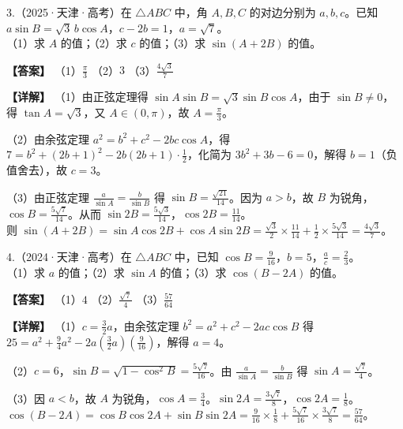 \documentclass[UTF8,10pt,aspectratio=169]{ctexbeamer}
\begin{document}
	\begin{frame}
		3.（2025·天津·高考）在 $\triangle ABC$ 中，角 $A, B, C$ 的对边分别为 $a, b, c$。已知 $a\sin B = \sqrt{3}\,b\cos A$，$c - 2b = 1$，$a = \sqrt{7}$。\\
		（1）求 $A$ 的值；\quad （2）求 $c$ 的值；\quad （3）求 $\sin(A+2B)$ 的值。
		
		\vspace{0.3cm}
		\pause
		\textbf{【答案】} （1）$\frac{\pi}{3}$ \quad （2）$3$ \quad （3）$\frac{4\sqrt{3}}{7}$
		
		\vspace{0.2cm}
		\textbf{【详解】} 
		（1）由正弦定理得 $\sin A\sin B = \sqrt{3}\sin B\cos A$，由于 $\sin B \neq 0$，得 $\tan A = \sqrt{3}$，又 $A \in (0, \pi)$，故 $A = \frac{\pi}{3}$。
		
		（2）由余弦定理 $a^2 = b^2 + c^2 - 2bc\cos A$，得 $7 = b^2 + (2b+1)^2 - 2b(2b+1) \cdot \frac{1}{2}$，化简为 $3b^2 + 3b - 6 = 0$，解得 $b=1$（负值舍去），故 $c=3$。
		
		（3）由正弦定理 $\frac{a}{\sin A} = \frac{b}{\sin B}$ 得 $\sin B = \frac{\sqrt{21}}{14}$。因为 $a > b$，故 $B$ 为锐角，$\cos B = \frac{5\sqrt{7}}{14}$。从而 $\sin 2B = \frac{5\sqrt{3}}{14}$，$\cos 2B = \frac{11}{14}$。\\
		则 $\sin(A+2B) = \sin A\cos 2B + \cos A\sin 2B = \frac{\sqrt{3}}{2} \times \frac{11}{14} + \frac{1}{2} \times \frac{5\sqrt{3}}{14} = \frac{4\sqrt{3}}{7}$。
	\end{frame}
	
	\begin{frame}
		4.（2024·天津·高考）在 $\triangle ABC$ 中，已知 $\cos B = \frac{9}{16}$，$b = 5$，$\frac{a}{c} = \frac{2}{3}$。\\
		（1）求 $a$ 的值；\quad （2）求 $\sin A$ 的值；\quad （3）求 $\cos(B-2A)$ 的值。
		
		\vspace{0.3cm}
		\pause
		\textbf{【答案】} （1）$4$ \quad （2）$\frac{\sqrt{7}}{4}$ \quad （3）$\frac{57}{64}$
		
		\vspace{0.2cm}
		\textbf{【详解】} 
		（1）$c = \frac{3}{2}a$，由余弦定理 $b^2 = a^2 + c^2 - 2ac\cos B$ 得 $25 = a^2 + \frac{9}{4}a^2 - 2a(\frac{3}{2}a)(\frac{9}{16})$，解得 $a=4$。
		
		（2）$c=6$，$\sin B = \sqrt{1-\cos^2 B} = \frac{5\sqrt{7}}{16}$。由 $\frac{a}{\sin A} = \frac{b}{\sin B}$ 得 $\sin A = \frac{\sqrt{7}}{4}$。
		
		（3）因 $a < b$，故 $A$ 为锐角，$\cos A = \frac{3}{4}$。$\sin 2A = \frac{3\sqrt{7}}{8}$，$\cos 2A = \frac{1}{8}$。\\
		$\cos(B-2A) = \cos B\cos 2A + \sin B\sin 2A = \frac{9}{16} \times \frac{1}{8} + \frac{5\sqrt{7}}{16} \times \frac{3\sqrt{7}}{8} = \frac{57}{64}$。
	\end{frame}
	
\end{document}
